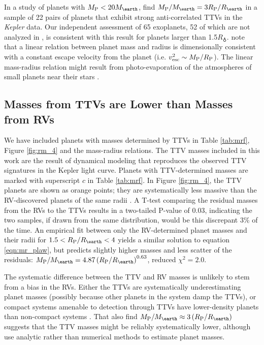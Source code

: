 \documentclass[iop]{emulateapj}
\newcommand{\rpl}{\ensuremath{R_{\rm P}}}
\newcommand{\mpl}{\ensuremath{M_{\rm P}}}
\newcommand{\rearth}{\ensuremath{R_\earth}}
\newcommand{\mearth}{\ensuremath{M_\earth}}
\begin{document}
In a study of planets with $\mpl < 20\mearth$, \citet{WL2013} find $\mpl/\mearth = 3 \rpl/\rearth$ in a sample of 22 pairs of planets that exhibit strong anti-correlated TTVs in the \textit{Kepler} data.  Our independent assessment of 65 exoplanets, 52 of which are not analyzed in \citet{WL2013}, is consistent with this result for planets larger than 1.5\rearth.  \citet{WL2013} note that a linear relation between planet mass and radius is dimensionally consistent with a constant escape velocity from the planet (i.e. $v_{\mathrm{esc}}^2 \sim \mpl/\rpl$).  The linear mass-radius relation might result from photo-evaporation of the atmospheres of small planets near their stars \citep{Lopez2012}.

\subsection{Masses from TTVs are Lower than Masses from RVs}
We have included planets with masses determined by TTVs in Table \ref{tab:mrf}, Figure \ref{fig:rm_4} and the mass-radius relations.  The TTV masses included in this work are the result of dynamical modeling that reproduces the observed TTV signatures in the Kepler light curve.  Planets with TTV-determined masses are marked with superscript $c$ in Table \ref{tab:mrf}.  In Figure \ref{fig:rm_4}, the TTV planets are shown as orange points; they are systematically less massive than the RV-discovered planets of the same radii \citep[also see][]{Jontof-Hutter2013}.  A T-test comparing the residual masses from the RVs to the TTVs results in a two-tailed P-value of 0.03, indicating the two samples, if drawn from the same distribution, would be this discrepant 3\% of the time.  An empirical fit between only the RV-determined planet masses and their radii for $1.5 < \rpl/\rearth < 4$ yields a similar solution to equation \ref{eqn:mr_plaw}, but predicts slightly higher masses and less scatter of the residuals: $\mpl/\mearth = 4.87 \left( \rpl/\rearth \right)^{0.63}$, reduced $\chi^2 = 2.0.$

The systematic difference between the TTV and RV masses is unlikely to stem from a bias in the RVs.  Either the TTVs are systematically underestimating planet masses (possibly because other planets in the system damp the TTVs), or compact systems amenable to detection through TTVs have lower-density planets than non-compact systems \citep[e.g. the Kepler-11 system,][]{Lissauer2013}.  That \citet{WL2013} also find $\mpl/\mearth \approx 3 \left(\rpl/\rearth\right)$ suggests that the TTV masses might be reliably systematically lower, although \citet{WL2013} use analytic rather than numerical methods to estimate planet masses.
\end{document}
